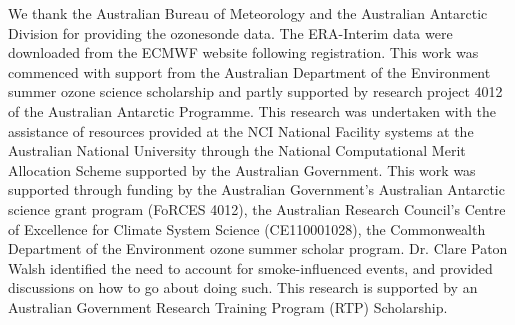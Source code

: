 \documentclass[acp, manuscript]{copernicus} %
\begin{document}
\begin{acknowledgements}
We thank the Australian Bureau of Meteorology and the Australian Antarctic Division for providing the ozonesonde data. 
The ERA-Interim data were downloaded from the ECMWF website following registration.
This work was commenced with support from the Australian Department of the Environment summer ozone science scholarship and partly supported by research project 4012 of the Australian Antarctic Programme.
This research was undertaken with the assistance of resources provided at the NCI National Facility systems at the Australian National University through the National Computational Merit Allocation Scheme supported by the Australian Government.
This work was supported through funding by the Australian Government's Australian Antarctic science grant program (FoRCES 4012), the Australian Research Council's Centre of Excellence for Climate System Science (CE110001028), the Commonwealth Department of the Environment ozone summer scholar program.
Dr. Clare Paton Walsh identified the need to account for smoke-influenced events, and provided discussions on how to go about doing such.
This research is supported by an Australian Government Research Training Program (RTP) Scholarship.
\end{acknowledgements}





\end{document}
